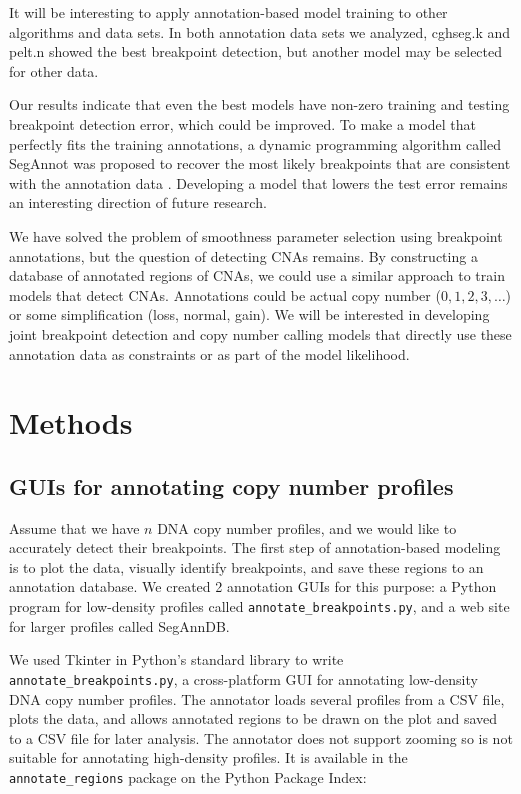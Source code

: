 \documentclass[10pt]{bmc_article}
\newcommand{\model}[1]{#1}
\newenvironment{bmcformat}{\begin{raggedright}\baselineskip20pt\sloppy\setboolean{publ}{false}}{\end{raggedright}\baselineskip20pt\sloppy}
\begin{document}
\begin{bmcformat}
It will be interesting to apply annotation-based model training to
other algorithms and data sets. In both annotation data sets we
analyzed, \model{cghseg.k} and \model{pelt.n} showed the best
breakpoint detection, but another model may be selected for other
data.
 
Our results indicate that even the best models have non-zero training
and testing breakpoint detection error, which could be
improved. To make a model that perfectly fits the training
annotations, a dynamic programming algorithm called SegAnnot was
proposed to recover the most likely breakpoints that are consistent
with the annotation data \cite{SegAnnot}. Developing a model that
lowers the test error remains an interesting direction of future
research.


We have solved the problem of smoothness parameter selection using
breakpoint annotations, but the question of detecting CNAs remains. By
constructing a database of annotated regions of CNAs, we could use a
similar approach to train models that detect CNAs. Annotations could
be actual copy number ($0,1,2,3,\dots$) or some simplification (loss,
normal, gain).  We will be interested in developing joint breakpoint
detection and copy number calling models that directly use these
annotation data as constraints or as part of the model likelihood.


\section*{Methods}
\label{training}

\subsection*{GUIs for annotating copy number profiles}

Assume that we have $n$ DNA copy number profiles, and we would like to
accurately detect their breakpoints. The first step of
annotation-based modeling is to plot the data, visually identify
breakpoints, and save these regions to an annotation database. We
created 2 annotation GUIs for this purpose: a Python program
for low-density profiles called
\mbox{\texttt{annotate\_breakpoints.py}}, and a web site for larger
profiles called SegAnnDB.

We used Tkinter in Python's standard library to write
\texttt{annotate\_breakpoints.py}, a cross-platform GUI for annotating
low-density DNA copy number profiles. The annotator loads several
profiles from a CSV file, plots the data, and allows annotated regions
to be drawn on the plot and saved to a CSV file for later
analysis. The annotator does not support zooming so is not suitable
for annotating high-density profiles. It is available in the
\texttt{annotate\_regions} package on the Python Package Index:


\end{bmcformat}
\end{document}
